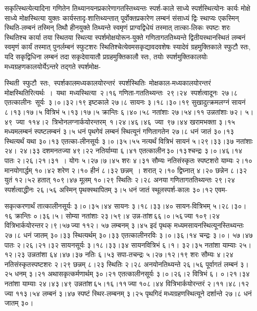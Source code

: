 \documentclass[11pt, openany]{book}
\begin{document}
सकृत्स्थित्येत्यादिना गणितेन तिथ्यानयनप्रकारेणागतस्तिथ्यन्तः स्पर्श-काले साध्ये स्पर्शस्थित्योनः कार्यः मोक्षे साध्ये मोक्षस्थित्या युक्तः कार्यस्तादृ-शात्तिथ्यन्तात् पूर्वोक्तप्रकारेण लम्बनं संसाध्यं द्विः स्थाप्यः एकस्मिन् स्थिति-लम्बनं तस्मिन् तिथौ हीनयुक्ते तिथ्यन्ते स्वमृणं प्राग्वद्विधेयं तस्मात् तात्का-लिकः स्पष्टः शरः स्थितिश्च कार्या तया स्थितया स्थित्या स्पर्शमोक्षयोरून-युक्ते \;गणितागततिथ्यन्ते \;द्वितीयस्थानस्थितं \;लम्बनं \;स्वमृणं \;कार्यं \;तस्मात् पुनर्लम्बनं स्फुटशरः स्थितिश्चेत्येवमसकृद्यावदवशेषः स्यादेवं ग्रहमुक्तिकाले स्फुटौ स्तः, यदि सकृद्विधिना लम्बनं तदा सकृदेवायातौ प्रग्रहमुक्तिकालौ स्तः, तयोः स्पर्शमुक्तिकालयोः मध्यग्रहणकालयोर्येऽन्तरे तद्गते स्पर्शमोक्ष-

\newpage

\noindent स्थिती \,स्फुटौ \,स्तः, \,स्पर्शकालमध्यकालयोरन्तरं \,स्पर्शस्थितिः \,मोक्षकाल-मध्यकालयोरन्तरं \,मोक्षस्थितिरित्यर्थः~। \,यथा \,मध्यस्थित्या \,२।१६ गणिता-गततिथ्यन्तः \,२९।२४ \,स्पर्शत्वादूनः \,२७।८ \,एतत्कालीनः \,सूर्यः \,३।०।३२।१९ इष्टकाले २७।८ सायनः ३।१८।३०।१९ सुखादुत्क्रमलग्नं सायनं ८।१३।१७।५ वित्रिभं ५।१३।१७।५ क्रान्तिः ६।४०।५८ नतांशाः २७।५४।११ उन्नतांशाः ७२। ५।४९ \,ज्या \,११४।२ \,त्रिभोनलग्नार्कयोरन्तरम् \,१।२४।४६।४६ \,ज्या \,९७।४४ खरामभक्ता \;३।१५ \;मध्यमलम्बनं \;स्पष्टलम्बनं \;३।५ \;धनं \;पृथगेवं \;लम्बनं स्थित्यूनं गणितागतेन २७।८ धनं जातं ३०।१३ स्थित्यर्थं यथा ३०।१३ एतत्का-लीनसूर्यः ३।०।३५।५५ नत्यर्थं वित्रिभं सायनं ५।२९।३३।३७ नतांशाः २४। २४।३३ दशमनतज्या ४९।२२ नतिर्याम्या ६।४१ एतत्कालीन\textendash \,३०।१३\textendash \,श्चन्द्रः ३।०।४६।१४ पातः २।२६।२१।३१~। योगः ५।२७।७।४५ शरः ४।३१ सौम्यः नतिसंस्कृतः स्पष्टशरो याम्यः २।१० मानयोगार्द्धम् १०।४२ शरेण २।१० हीनं ८।३२ छन्नम्~। शरात् २।१० द्विघ्नात् ४।२० छन्नेन ८।३२ युतं १२।५२ हतात् १०९।४७ मूलम् १०।२९ स्थितिः २।२८ अनया गणितागततिथ्यन्तः २९।२४ स्पर्शत्वाद्धीनः २६।५६ अस्मिन् पृथक्स्थापितम् ३।५ धनं जातं स्थूलस्पर्श-कालः ३०।१२ एवम-

\newpage

\noindent सकृत्करणार्थं तात्कालीनसूर्यः ३।०।३५।४४ सायनः ३।१८।३३।४० सायन-वित्रिभम् ५।२८।३०।१६ क्रान्तिः ०।३६।५। सोम्या नतांशाः २३।५९।४ उन्न-तांश\textendash \,६६।०।५६\textendash \,ज्या १०९।२४ वित्रिभार्कयोरन्तर\textendash \,२।९।५७\textendash \,ज्या ११२। ५७ लम्बनम् ३।४५ इदं पृथक् मध्यमसायनस्थित्यूनस्तिथ्यन्तः २७।८ धनं जातम् ३०।३३ स्थित्यर्थम् ३०।३३ एतत्कालीनरविः ३।०।३६।१४ चन्द्रः ३।०। ५७।४७ पातः २।२६।२१।३२ सायनसूर्यः ३।१८।३३।३४ सायनवित्रिभं ६।१। ३२।३५ नतांशा याम्याः २५।१२।२३ उन्नतांशा ६४।४७।३७ नतिः ६।५३ सपा-तचन्द्रः ५।२७।१२।१९ शरः सौम्यः ४।२४ नतिसंस्कृतस्पष्टशरः २।२९ छन्नम् ८।२३ स्थितिः २।२८ अनयोनतिथ्यन्ते २६।५६ पूर्वागतं लम्बनं ३।२५ धनम् ३।२१ अथासकृत्कर्मणार्थम् ३०।२१ एतत्कालीनसूर्यः ३।०।२६।२ वित्रिभं ६। ०।२१।३४ नतांशा याम्याः २४।४३।४९ उन्नतांश\textendash \,६५।१६।११\textendash \,ज्या १०८।४४ वित्रिभार्कयोरन्तरं २।११।४८।१२ ज्या ११३।५४ लम्बनं ३।४७ स्पष्टं स्थिर-लम्बनम् ३।२५ पृथगिदं मध्यग्रहणस्थित्यूने दर्शान्ते २७।८ धनं जातम् ३०।
\end{document}
